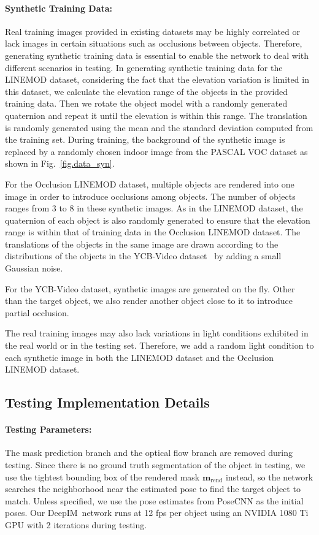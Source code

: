 \documentclass[twocolumn]{svjour3}
\newcommand{\dimnet}[0]{DeepIM}
\newcommand{\mrend}[0]{\mathbf{m}_{\text{rend}}}
\begin{document}
\paragraph{Synthetic Training Data:}
Real training images provided in existing datasets may be highly correlated or lack images in certain situations such as occlusions between objects. Therefore, generating synthetic training data is essential to enable the network to deal with different scenarios in testing. In generating synthetic training data for the LINEMOD dataset, considering the fact that the elevation variation is limited in this dataset, we calculate the elevation range of the objects in the provided training data. Then we rotate the object model with a randomly generated quaternion and repeat it until the elevation is within this range. The translation is randomly generated using the mean and the standard deviation computed from the training set. During training, the background of the synthetic image is replaced by a randomly chosen indoor image from the PASCAL VOC dataset as shown in Fig.~\ref{fig.data_syn}.

For the Occlusion LINEMOD dataset, multiple objects are rendered into one image in order to introduce occlusions among objects. 
The number of objects ranges from 3 to 8 in these synthetic images. 
As in the LINEMOD dataset, the quaternion of each object is also randomly generated to ensure that the elevation range is within that of training data in the Occlusion LINEMOD dataset. 
The translations of the objects in the same image are drawn according to the distributions of the objects in the YCB-Video dataset~\citep{xiang2017posecnn} by adding a small Gaussian noise.

For the YCB-Video dataset, synthetic images are generated on the fly. Other than the target object, we also render another object close to it to introduce partial occlusion.

The real training images may also lack variations in light conditions exhibited in the real world or in the testing set. 
Therefore, we add a random light condition to each synthetic image in both the LINEMOD dataset and the Occlusion LINEMOD dataset.

\subsection{Testing Implementation Details} 
\paragraph{Testing Parameters:}
The mask prediction branch and the optical flow branch are removed during testing. Since there is no ground truth segmentation of the object in testing, we use the tightest bounding box of the rendered mask $\mrend$ instead, so the network searches the neighborhood near the estimated pose to find the target object to match. Unless specified, we use the pose estimates from PoseCNN \citep{xiang2017posecnn} as the initial poses. Our \dimnet\ network runs at 12 fps per object using an NVIDIA 1080 Ti GPU with 2 iterations during testing.
\end{document}
